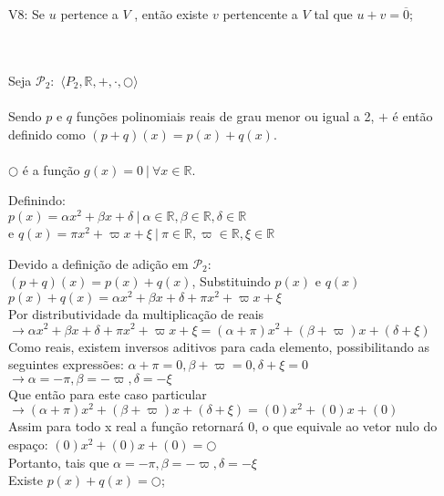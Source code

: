 \documentclass[12pt, twoside, a4]{article} %
\begin{document}
\begin{large}
    \begin{bf}
        V8: Se $u$ pertence a $V$ , então existe $v$ pertencente a $V$ tal que
        $u + v = \overline{0}$;
    \end{bf} 
\end{large} \\ \\
Seja $\mathcal{P}_2 :$
$\langle P_2, \mathbb{R}, +, \cdot, \bigcirc \rangle $ \\ \\
Sendo $p$ e $q$ funções polinomiais reais de grau menor ou igual a 2, $+$ é então definido como $(p + q)(x) = p(x) + q(x)$. \\ \\
$\bigcirc$ é a função $ g(x) = 0 ~ | ~ \forall x \in \mathbb{R} $. \\
\begin{center}
    \vspace{-2cm}
    Definindo: \\  $p(x) = \alpha x^2 + \beta x + \delta ~ | ~ \alpha \in \mathbb{R}, \beta \in \mathbb{R}, \delta \in \mathbb{R}$ \\
   e $q(x) = \pi x^2 + \varpi  x + \xi  ~ | ~ \pi \in \mathbb{R}, \varpi  \in \mathbb{R}, \xi  \in \mathbb{R}$

    \begin{doublespacing}

        Devido a definição de adição em $\mathcal{P}_2 :$ \\
        $(p + q)(x) = p(x) + q(x)$, Substituindo $p(x)$ e $q(x)$ \\

       $p(x) + q(x) = \alpha x^2 + \beta x + \delta + \pi x^2 + \varpi  x + \xi $ \\
        Por distributividade da multiplicação de reais
        $\to \alpha x^2 + \beta x + \delta + \pi x^2 + \varpi  x + \xi = (\alpha + \pi)x^2 + (\beta + \varpi)x + (\delta + \xi)$ \\
        Como reais, existem inversos aditivos para cada elemento, possibilitando as seguintes expressões:
        $ \alpha + \pi = 0 , \beta + \varpi = 0, \delta + \xi = 0$ \\
        $\to \alpha = -\pi , \beta = - \varpi, \delta = - \xi$ \\
        Que então para este caso particular \\
        $\to (\alpha + \pi)x^2 + (\beta + \varpi)x + (\delta + \xi) = (0)x^2 + (0)x + (0)$ \\
        Assim para todo x real a função retornará 0, o que equivale ao vetor nulo do espaço: 
        $(0)x^2 + (0)x + (0) = \bigcirc$ \\ 
        Portanto, tais que $\alpha = -\pi , \beta = - \varpi, \delta = - \xi$ \\
        Existe  $p(x) + q(x) = \bigcirc$;
    \end{doublespacing}
\end{center}
\end{document}
